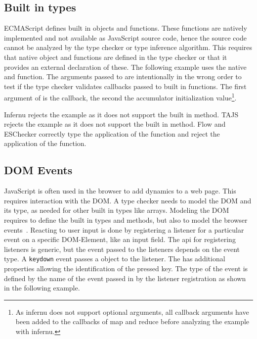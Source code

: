 \subsection{Built in types}
ECMAScript defines built in objects and functions. These functions are natively implemented and not available as JavaScript source code, hence the source code cannot be analyzed by the type checker or type inference algorithm. This requires that native object and functions are defined in the type checker or that it provides an external declaration of these. The following example uses the native  and  function. The arguments passed to  are intentionally in the wrong order to test if the type checker validates callbacks passed to built in functions. The first argument of  is the callback, the second the accumulator initialization value\footnote{As infernu does not support optional arguments, all callback arguments have been added to the callbacks of map and reduce before analyzing the example with infernu.}. 


Infernu rejects the example as it does not support the built in  method. TAJS rejects the example as it does not support the built in  method. Flow and ESChecker correctly type the application of the  function and reject the application of the  function.

\subsection{DOM Events}
JavaScript is often used in the browser to add dynamics to a web page. This requires interaction with the DOM. A type checker needs to model the DOM and its type, as needed for other built in types like arrays. Modeling the DOM requires to define the built in types and methods, but also to model the browser events~\cite{JensenMadsenMoller2011}. Reacting to user input is done by registering a listener for a particular event on a specific DOM-Element, like an input field. The api for registering listeners is generic, but the event passed to the listeners depends on the event type. A \texttt{keydown} event passes a  object to the listener. The  has additional properties allowing the identification of the pressed key. The type of the event is defined by the name of the event passed in by the listener registration as shown in the following example.


